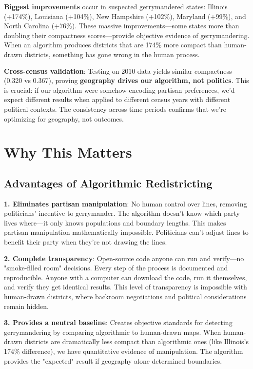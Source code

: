 \documentclass[11pt]{article}
\begin{document}
\textbf{Biggest improvements} occur in suspected gerrymandered states: Illinois (+174\%), Louisiana (+104\%), New Hampshire (+102\%), Maryland (+99\%), and North Carolina (+76\%). These massive improvements—some states more than doubling their compactness scores—provide objective evidence of gerrymandering. When an algorithm produces districts that are 174\% more compact than human-drawn districts, something has gone wrong in the human process.

\textbf{Cross-census validation}: Testing on 2010 data yields similar compactness (0.320 vs 0.367), proving \textbf{geography drives our algorithm, not politics}. This is crucial: if our algorithm were somehow encoding partisan preferences, we'd expect different results when applied to different census years with different political contexts. The consistency across time periods confirms that we're optimizing for geography, not outcomes.

\section{Why This Matters}

\subsection{Advantages of Algorithmic Redistricting}

\textbf{1. Eliminates partisan manipulation}: No human control over lines, removing politicians' incentive to gerrymander. The algorithm doesn't know which party lives where—it only knows populations and boundary lengths. This makes partisan manipulation mathematically impossible. Politicians can't adjust lines to benefit their party when they're not drawing the lines.

\textbf{2. Complete transparency}: Open-source code anyone can run and verify—no "smoke-filled room" decisions. Every step of the process is documented and reproducible. Anyone with a computer can download the code, run it themselves, and verify they get identical results. This level of transparency is impossible with human-drawn districts, where backroom negotiations and political considerations remain hidden.

\textbf{3. Provides a neutral baseline}: Creates objective standards for detecting gerrymandering by comparing algorithmic to human-drawn maps. When human-drawn districts are dramatically less compact than algorithmic ones (like Illinois's 174\% difference), we have quantitative evidence of manipulation. The algorithm provides the "expected" result if geography alone determined boundaries.
\end{document}
